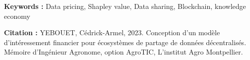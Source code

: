 \textbf{Keywords :} Data pricing, Shapley value, Data sharing, Blockchain, knowledge economy

\textbf{Citation :} YEBOUET, Cédrick-Armel, 2023. Conception d'un modèle d'intéressement financier pour écosystèmes de partage de données décentralisés. Mémoire d’Ingénieur Agronome, option AgroTIC, L'institut Agro Montpellier.

\newpage

